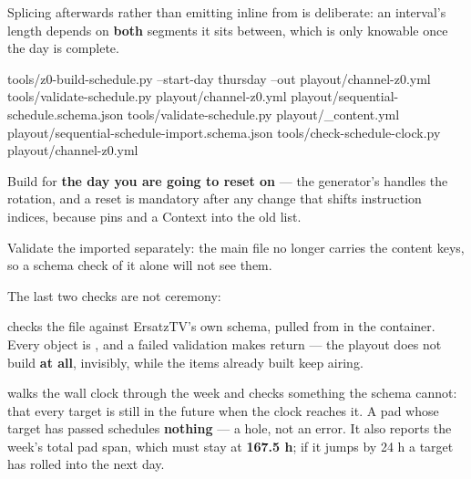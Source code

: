 \documentclass[fontpath=fonts/,logopath=logo/]{riposte-doc}
\begin{document}
Splicing afterwards rather than emitting inline from  is deliberate: an interval's length depends on \textbf{both} segments it sits between, which is only knowable once the day is complete.

\ripcodeopen
{}
\begin{ripcodeblock}
tools/z0-build-schedule.py --start-day thursday --out playout/channel-z0.yml
tools/validate-schedule.py playout/channel-z0.yml playout/sequential-schedule.schema.json
tools/validate-schedule.py playout/_content.yml  playout/sequential-schedule-import.schema.json
tools/check-schedule-clock.py playout/channel-z0.yml
\end{ripcodeblock}
\ripcodesizereset\ripcodeclose

Build for \textbf{the day you are going to reset on} — the generator's  handles the rotation, and a reset is mandatory after any change that shifts instruction indices, because  pins  and a Context  into the old list.

Validate the imported  separately: the main file no longer carries the content keys, so a schema check of it alone will not see them.

The last two checks are not ceremony:

\begin{ripbullets}
\item \textbf{} checks the file against ErsatzTV's own schema, pulled from  in the container. Every object is , and a failed validation makes  return  — the playout does not build \textbf{at all}, invisibly, while the items already built keep airing.
\item \textbf{} walks the wall clock through the week and checks something the schema cannot: that every  target is still in the future when the clock reaches it. A pad whose target has passed schedules \textbf{nothing} — a hole, not an error. It also reports the week's total pad span, which must stay at \textbf{167.5 h}; if it jumps by 24 h a target has rolled into the next day.
\end{ripbullets}
\end{document}

